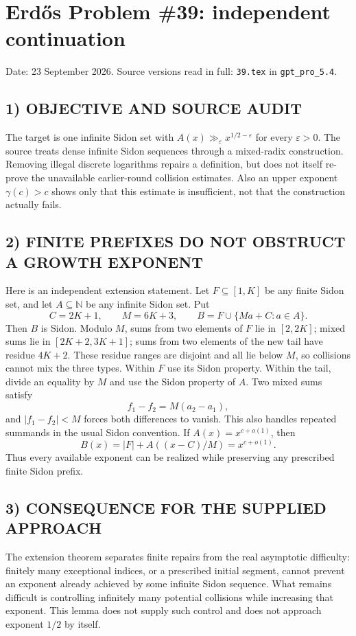 \section{Erd\H{o}s Problem \#39: independent continuation}
\noindent Date: 23 September 2026. Source versions read in full: \texttt{39.tex} in \texttt{gpt\_pro\_5.4}.

\subsection*{1) OBJECTIVE AND SOURCE AUDIT}
The target is one infinite Sidon set with $A(x)\gg_\varepsilon x^{1/2-\varepsilon}$ for every $\varepsilon>0$. The source treats dense infinite Sidon sequences through a mixed-radix construction. Removing illegal discrete logarithms repairs a definition, but does not itself re-prove the unavailable earlier-round collision estimates. Also an upper exponent $\gamma(c)>c$ shows only that this estimate is insufficient, not that the construction actually fails.
\subsection*{2) FINITE PREFIXES DO NOT OBSTRUCT A GROWTH EXPONENT}
Here is an independent extension statement. Let $F\subseteq[1,K]$ be any finite Sidon set, and let $A\subseteq\mathbb N$ be any infinite Sidon set. Put
\[
C=2K+1,\qquad M=6K+3,\qquad B=F\cup\{Ma+C:a\in A\}.
\]
Then $B$ is Sidon. Modulo $M$, sums from two elements of $F$ lie in $[2,2K]$; mixed sums lie in $[2K+2,3K+1]$; sums from two elements of the new tail have residue $4K+2$. These residue ranges are disjoint and all lie below $M$, so collisions cannot mix the three types. Within $F$ use its Sidon property. Within the tail, divide an equality by $M$ and use the Sidon property of $A$. Two mixed sums satisfy
\[
f_1-f_2=M(a_2-a_1),
\]
and $|f_1-f_2|<M$ forces both differences to vanish. This also handles repeated summands in the usual Sidon convention.
If $A(x)=x^{c+o(1)}$, then
\[
B(x)=|F|+A((x-C)/M)=x^{c+o(1)}.
\]
Thus every available exponent can be realized while preserving any prescribed finite Sidon prefix.
\subsection*{3) CONSEQUENCE FOR THE SUPPLIED APPROACH}
The extension theorem separates finite repairs from the real asymptotic difficulty: finitely many exceptional indices, or a prescribed initial segment, cannot prevent an exponent already achieved by some infinite Sidon sequence. What remains difficult is controlling infinitely many potential collisions while increasing that exponent. This lemma does not supply such control and does not approach exponent $1/2$ by itself.
